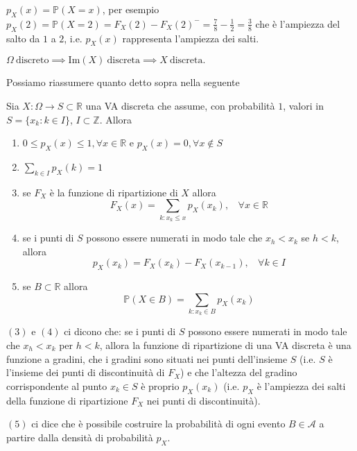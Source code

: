 $p_{X}( x) =\mathbb{P}( X=x)$, per esempio $p_{X}( 2) =\mathbb{P}( X=2) =F_{X}( 2) -F_{X}( 2)^{-} =\frac{7}{8} -\frac{1}{2} =\frac{3}{8}$ che è l'ampiezza del salto da $1$ a $2$, i.e. $p_{X}( x)$ rappresenta l'ampiezza dei salti.
\begin{oss}
$\Omega \ \text{discreto} \implies \mathrm{Im}( X) \ \text{discreta} \implies X\ \text{discreta} .$
\end{oss}
Possiamo riassumere quanto detto sopra nella seguente
\begin{theorem}
Sia $X:\Omega \rightarrow S\subset \mathbb{R}$ una VA discreta che assume, con probabilità $1$, valori in $S=\{x_{k} :k\in I\}$, $I\subset \mathbb{Z}$. Allora
\end{theorem}
\begin{enumerate}
\item $0\leq p_{X}( x) \leq 1,\forall x\in \mathbb{R}$ e $p_{X}( x) =0,\forall x\notin S$
\item $\sum\limits _{k\in I} p_{X}( k) =1$
\item se $F_{X}$ è la funzione di ripartizione di $X$ allora\begin{equation*}
F_{X}( x) =\sum\limits _{k:x_{k} \leq x} p_{X}( x_{k}) ,\ \ \ \ \forall x\in \mathbb{R}
\end{equation*}
\item se i punti di $S$ possono essere numerati in modo tale che $x_{h} < x_{k}$ se $h< k$, allora\begin{equation*}
p_{X}( x_{k}) =F_{X}( x_{k}) -F_{X}( x_{k-1}) ,\ \ \ \ \forall k\in I
\end{equation*}
\item se $B\subset \mathbb{R}$ allora\begin{equation*}
\mathbb{P}( X\in B) =\sum\limits _{k:x_{k} \in B} p_{X}( x_{k})
\end{equation*}
\end{enumerate}
\begin{oss}
$( 3)$ e $( 4)$ ci dicono che: se i punti di $S$ possono essere numerati in modo tale che $x_{h} < x_{k}$ per $h< k$, allora la funzione di ripartizione di una VA discreta è una funzione a gradini, che i gradini sono situati nei punti dell'insieme $S$ (i.e. $S$ è l'insieme dei punti di discontinuità di $F_{X}$) e che l'altezza del gradino corrispondente al punto $x_{k} \in S$ è proprio $p_{X}( x_{k})$ (i.e. $p_{X}$ è l'ampiezza dei salti della funzione di ripartizione $F_{X}$ nei punti di discontinuità).

$( 5)$ ci dice che è possibile costruire la probabilità di ogni evento $B\in \mathcal{A}$ a partire dalla densità di probabilità $p_{X}$.
\end{oss}
